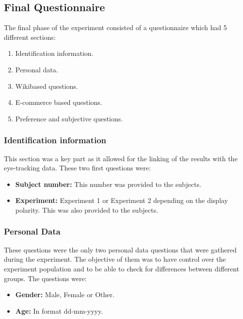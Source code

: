 \subsection{Final Questionnaire}
\label{sec:final_questionnaire}
The final phase of the experiment consisted of a questionnaire which had 5 different sections:
\begin{enumerate}
    \item Identification information.
    \item Personal data.
    \item Wikibased questions.
    \item E-commerce based questions.
    \item Preference and subjective questions.
\end{enumerate}
\subsubsection{Identification information}
This section was a key part as it allowed for the linking of the results with the eye-tracking data. 
These two first questions were:
\begin{itemize}
    \item \textbf{Subject number:} This number was provided to the subjects.
    \item \textbf{Experiment:} Experiment 1 or Experiment 2 depending on the display polarity. This was also provided to the subjects.
\end{itemize}
\subsubsection{Personal Data}
These questions were the only two personal data questions that were gathered during the experiment. 
The objective of them was to have control over the experiment population and to be able to check 
for differences between different groups. The questions were:
\begin{itemize}
    \item \textbf{Gender:} Male, Female or Other.
    \item \textbf{Age:} In format dd-mm-yyyy.
\end{itemize}

